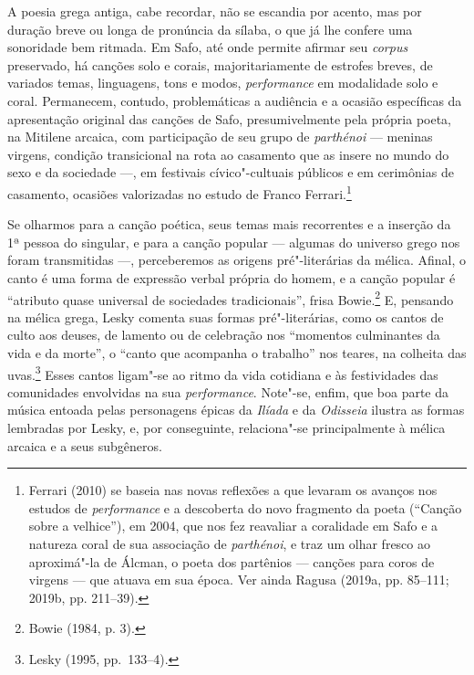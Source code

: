 A poesia grega antiga, cabe recordar, não se
escandia por acento, mas por duração breve ou longa de pronúncia da sílaba, o
que já lhe confere uma sonoridade bem ritmada. Em Safo, até onde permite
afirmar seu \textit{corpus} preservado,
há canções solo e corais, majoritariamente de estrofes breves, de variados temas,
linguagens, tons e modos, \textit{performance} em modalidade solo e coral.
Permanecem, contudo, problemáticas a
audiência e a ocasião específicas da apresentação original das canções
de Safo, presumivelmente pela própria poeta, na Mitilene arcaica, com participação de seu grupo de \textit{parthénoi} --- meninas virgens, condição transicional na rota ao casamento que as insere no mundo do sexo e da sociedade ---, em festivais cívico"-cultuais públicos e em cerimônias de casamento, ocasiões valorizadas no estudo de Franco Ferrari.\footnote{Ferrari (2010) se baseia nas novas reflexões a que levaram os avanços nos estudos de \textit{performance} e a descoberta do novo fragmento da poeta (``Canção sobre a velhice''), em 2004, que nos fez reavaliar a coralidade em Safo e a natureza coral de sua associação de \textit{parthénoi}, e traz um olhar fresco ao aproximá"-la de Álcman, o poeta dos partênios --- canções para coros de virgens --- que atuava em sua época. Ver ainda Ragusa (2019a, pp. 85--111; 2019b, pp. 211--39).}

Se olharmos para a canção poética, seus temas mais recorrentes e a inserção da
1ª pessoa do singular, e para a canção popular --- algumas do universo grego nos
foram transmitidas ---, perceberemos as origens pré"-literárias da mélica. Afinal,
o canto é uma forma de expressão verbal própria do homem, e a canção popular é
“atributo quase universal de sociedades tradicionais”, frisa Bowie.\footnote{
Bowie (1984, p. 3).} E, pensando na mélica grega, Lesky comenta suas formas
pré"-literárias, como os cantos de culto aos deuses, de lamento ou de celebração
nos “momentos culminantes da vida e da morte”, o “canto que acompanha o
trabalho” nos teares, na colheita das uvas.\footnote{ Lesky (1995, pp.~133--4).} Esses cantos ligam"-se ao ritmo da
vida cotidiana e às festividades das comunidades envolvidas na sua
\textit{performance}. Note"-se, enfim, que boa parte da música entoada pelas
personagens épicas da \textit{Ilíada} e da \textit{Odisseia} ilustra as formas
lembradas por Lesky, e, por conseguinte, relaciona"-se principalmente à mélica
arcaica e a seus subgêneros.

